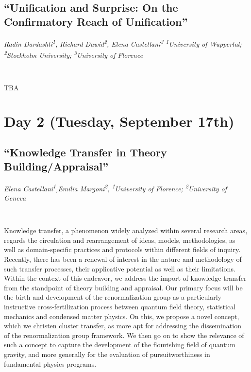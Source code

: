 \documentclass[11pt]{article}
\begin{document}
\printbibliography[heading=none]

\

\subsection*{\textsf{``Unification and Surprise: On the
Confirmatory Reach of Unification''}}

\textcolor{moderncvgreen}{
\textit{Radin Dardashti\textsuperscript{1}, Richard Dawid\textsuperscript{2}, Elena Castellani\textsuperscript{3} %
\newline
\textsuperscript{1}University of Wuppertal; \textsuperscript{2}Stockholm University; \textsuperscript{3}University of Florence
}
}

\ 

TBA


\newpage 

\section*{\textsf{Day 2 (Tuesday, September 17th)}}
\vspace{3em}

\subsection*{\textsf{``Knowledge Transfer in Theory
Building/Appraisal''}}

\textcolor{moderncvgreen}{
\textit{Elena Castellani\textsuperscript{1},Emilia Margoni\textsuperscript{2},  %
\newline
\textsuperscript{1}University of Florence; \textsuperscript{2}University of Geneva
}
}

\ 

Knowledge transfer, a phenomenon widely analyzed within several research areas, regards
the circulation and rearrangement of ideas, models, methodologies, as well as domain-specific
practices and protocols within different fields of inquiry. Recently, there has been a renewal of
interest in the nature and methodology of such transfer processes, their applicative potential
as well as their limitations. Within the context of this endeavor, we address the import of
knowledge transfer from the standpoint of theory building and appraisal. Our primary focus
will be the birth and development of the renormalization group as a particularly instructive
cross-fertilization process between quantum field theory, statistical mechanics and condensed
matter physics. On this, we propose a novel concept, which we christen cluster transfer, as
more apt for addressing the dissemination of the renormalization group framework. We then
go on to show the relevance of such a concept to capture the development of the flourishing
field of quantum gravity, and more generally for the evaluation of pursuitworthiness in fundamental physics programs.
\end{document}
